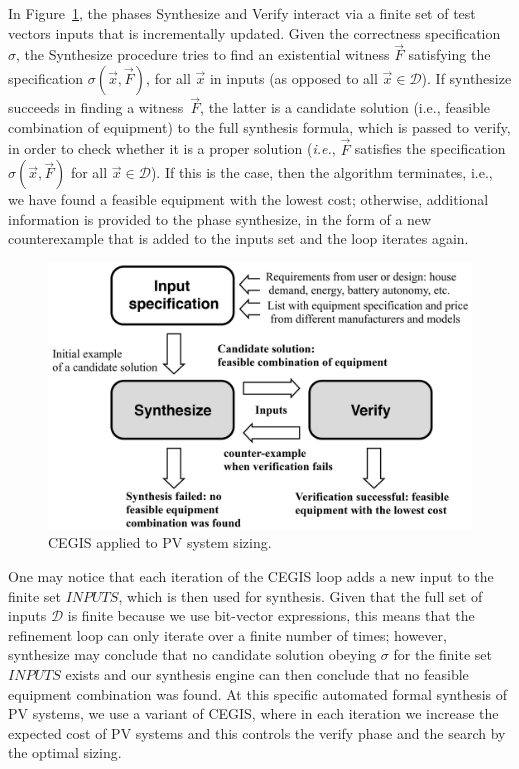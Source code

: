 \documentclass[runningheads]{llncs}
\begin{document}
In Figure~\ref{Counter-Example-Guided-Inductive-Synthesis}, the phases {\sc Synthesize} and {\sc Verify} interact via a finite set of test vectors {\sc inputs} that is incrementally updated. Given the correctness specification $\sigma$, the {\sc Synthesize} procedure tries to find an existential witness $\vec{F}$ satisfying the specification $\sigma(\vec{x}, \vec{F})$, for all $\vec{x}$ in {\sc inputs} (as opposed to all $\vec{x} \in \mathcal{D}$). If {\sc synthesize} succeeds in finding a witness~$\vec{F}$, the latter is a candidate solution (i.e., feasible combination of equipment) to the full synthesis formula, which is passed to {\sc verify}, in order to check whether it is a proper solution ({\it i.e.}, $\vec{F}$ satisfies the specification $\sigma(\vec{x}, \vec{F})$ for all $\vec{x}\in\mathcal{D}$). If this is the case, then the algorithm terminates, i.e., we have found a feasible equipment with the lowest cost; otherwise, additional information is provided to the phase {\sc synthesize}, in the form of a new counterexample that is added to the {\sc inputs} set and the loop iterates again. 
%
\begin{figure}[h]
	\centering
	\includegraphics[width=0.85\columnwidth]{fig2_rev.jpg}
	\caption{CEGIS applied to PV system sizing.}
	\label{Counter-Example-Guided-Inductive-Synthesis}
\end{figure}
%
One may notice that each iteration of the CEGIS loop adds a new input to the finite set $INPUTS$, which is then used for synthesis.  Given that the full set of inputs $\mathcal{D}$ is finite because we use bit-vector expressions, this means that the refinement loop can only iterate over a finite number of times; however, {\sc synthesize} may conclude that no candidate solution obeying $\sigma$ for the finite set $INPUTS$ exists and our synthesis engine can then conclude that no feasible equipment combination was found. At this specific automated formal synthesis of PV systems, we use a variant of CEGIS, where in each iteration we increase the expected cost of PV systems and this controls the {\sc verify} phase and the search by the optimal sizing.  %
\end{document}
